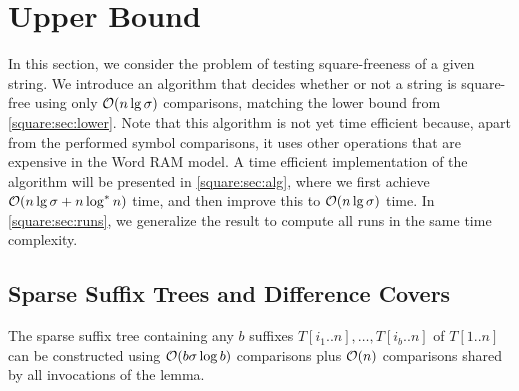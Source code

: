 \section{Upper Bound}
\label{square:sec:upper}

In this section, we consider the problem of testing square-freeness of a given string.
We introduce an algorithm that decides whether or not a string is square-free using only $\mathcal{O}(n \lg \sigma)$ comparisons, matching the lower bound from \cref{square:sec:lower}.
Note that this algorithm is not yet time efficient because, apart from the performed symbol comparisons, it uses other operations that are expensive in the Word RAM model.
A time efficient implementation of the algorithm will be presented in \cref{square:sec:alg}, where we first achieve $\mathcal{O}(n \lg \sigma + n \log^* n)$ time, and then improve this to $\mathcal{O}(n \lg \sigma)$ time.
In \cref{square:sec:runs}, we generalize the result to compute all runs in the same time complexity.

\subsection{Sparse Suffix Trees and Difference Covers}

\begin{lemma}
\label{lem:sparse}
The sparse suffix tree containing any $b$ suffixes $T[i_{1}..n], \ldots, T[i_{b}..n]$
of $T[1..n]$ can be constructed using $\mathcal{O}(b\sigma\log b)$ comparisons plus
$\mathcal{O}(n)$ comparisons shared by all invocations of the lemma.
\end{lemma}

